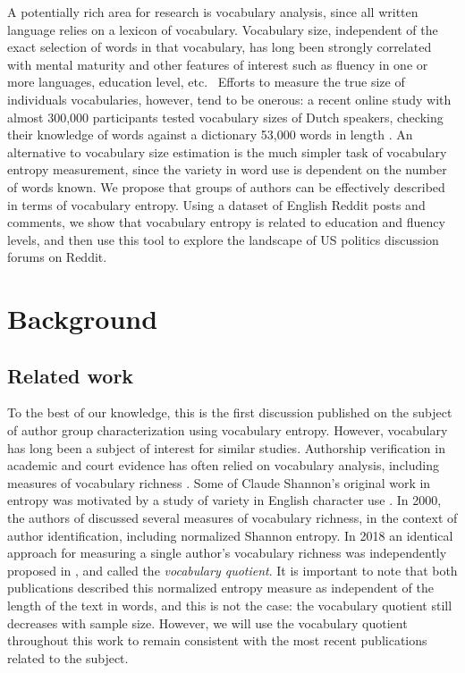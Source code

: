 \documentclass[sigconf]{acmart}
\begin{document}
A potentially rich area for research is vocabulary analysis, since all
written language relies on a lexicon of vocabulary. Vocabulary size,
independent of the exact selection of words in that vocabulary, has long
been strongly correlated with mental maturity and other features of interest
such as fluency in one or more languages, education level, etc. \cite%
{nation1993vocabulary}\cite{fox1949some} \ Efforts to measure the true size
of individuals vocabularies, however, tend to be onerous: a recent online
study with almost 300,000 participants tested vocabulary sizes of Dutch
speakers, checking their knowledge of words against a dictionary 53,000
words in length \cite{keuleers2015word}. An alternative to vocabulary size
estimation is the much simpler task of vocabulary entropy measurement, since
the variety in word use is dependent on the number of words known. We
propose that groups of authors can be effectively described in terms of
vocabulary entropy. Using a dataset of English Reddit posts and comments, we
show that vocabulary entropy is related to education and fluency levels, and
then use this tool to explore the landscape of US politics discussion forums
on Reddit. 

\section{Background}

\subsection{Related work}

To the best of our knowledge, this is the first discussion published on the
subject of author group characterization using vocabulary entropy. However,
vocabulary has long been a subject of interest for similar studies.
Authorship verification in academic and court evidence has often relied on
vocabulary analysis, including measures of vocabulary richness \cite%
{chaski2001empiricaleo}. Some of Claude Shannon's original work in entropy
was motivated by a study of variety in English character use \cite%
{shannon1951prediction}. In 2000, the authors of \cite{dale2000handbook}
discussed several measures of vocabulary richness, in the context of author
identification, including normalized Shannon entropy. In 2018 an identical
approach for measuring a single author's vocabulary richness was
independently proposed in \cite{rajput2018novel}, and called the \emph{%
vocabulary quotient}. It is important to note that both publications
described this normalized entropy measure as independent of the length of
the text in words, and this is not the case: the vocabulary quotient still
decreases with sample size. However, we will use the vocabulary quotient
throughout this work to remain consistent with the most recent publications
related to the subject.
\end{document}
